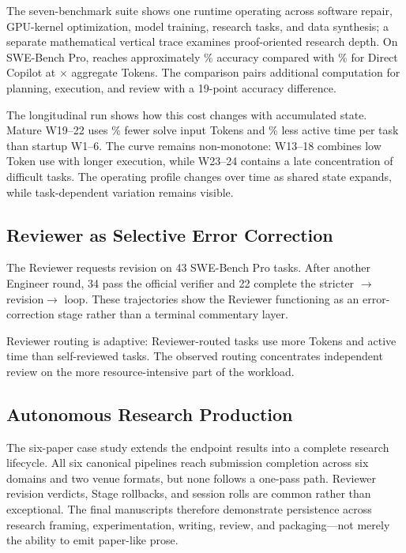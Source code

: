 The seven-benchmark suite shows one runtime operating across software repair,
GPU-kernel optimization, model training, research tasks, and data synthesis; a
separate mathematical vertical trace examines proof-oriented research depth. On
SWE-Bench Pro, \systemname reaches approximately \SWEProArgusAccuracy\%
accuracy compared with \SWEProDirectAccuracy\% for Direct Copilot at \SWEProTokenRatio$\times$ aggregate Tokens.
The comparison pairs additional computation for planning, execution, and review
with a 19-point accuracy difference.

The longitudinal run shows how this cost changes with accumulated state. Mature
W19--22 uses \SWEProTokenReduction\% fewer solve input Tokens and \SWEProTimeReduction\% less active time per task than
startup W1--6. The curve remains non-monotone: W13--18 combines low Token use with
longer execution, while W23--24 contains a late concentration of difficult tasks. The operating profile changes
over time as shared state expands, while task-dependent variation remains visible.

\subsection{Reviewer as Selective Error Correction}

The Reviewer requests revision on 43 SWE-Bench Pro tasks. After another Engineer
round, 34 pass the official verifier and 22 complete the stricter
$\rightarrow$revision$\rightarrow$ loop. These trajectories
show the Reviewer functioning as an error-correction stage rather than a terminal
commentary layer.

Reviewer routing is adaptive: Reviewer-routed tasks use more Tokens and active time
than self-reviewed tasks. The observed routing concentrates independent review on
the more resource-intensive part of the workload.

\subsection{Autonomous Research Production}

The six-paper case study extends the endpoint results into a complete research
lifecycle. All six canonical pipelines reach submission completion across six
domains and two venue formats, but none follows a one-pass path. Reviewer revision
verdicts, Stage rollbacks, and session rolls are common rather than exceptional.
The final manuscripts therefore demonstrate persistence across research framing,
experimentation, writing, review, and packaging---not merely the ability to emit
paper-like prose.

